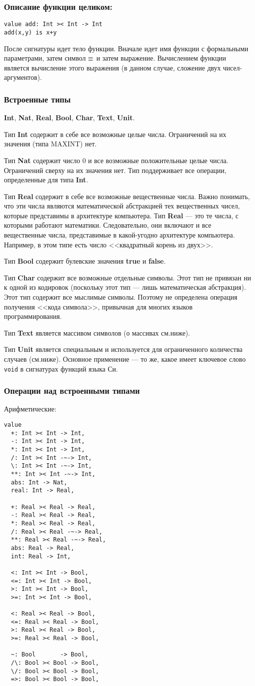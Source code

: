 \documentclass[14pt, twoside]{extreport}
\newcommand{\head}[1]{\vspace{1cm}\subsubsection*{#1}}
\begin{document}
\head{Описание функции целиком:}
\begin{lstlisting}
value add: Int >< Int -> Int
add(x,y) is x+y
\end{lstlisting}
После сигнатуры идет тело функции. Вначале идет имя функции с формальными параметрами, затем символ $\mathop{\equiv}$ и затем выражение. Вычислением функции является вычисление этого выражения (в данном случае, сложение двух чисел-аргументов).

\head{Встроенные типы}
\textbf{Int}, \textbf{Nat}, \textbf{Real}, \textbf{Bool}, \textbf{Char}, \textbf{Text}, \textbf{Unit}.

Тип \textbf{Int} содержит в себе все возможные целые числа. Ограничений на их значения (типа MAXINT) нет.

Тип \textbf{Nat} содержит число 0 и все возможные положительные целые числа. Ограничений сверху на их значения нет. Тип поддерживает все операции, определенные для типа \textbf{Int}.

Тип \textbf{Real} содержит в себе все возможные вещественные числа. Важно понимать, что эти числа являются математической абстракцией тех вещественных чисел, которые представимы в архитектуре компьютера. Тип \textbf{Real} --- это те числа, с которыми работают математики. Следовательно, они включают и все вещественные числа, представимые в какой-угодно архитектуре компьютера. Например, в этом типе есть число <<квадратный корень из двух>>.

Тип \textbf{Bool} содержит булевские значения \textbf{true} и \textbf{false}.

Тип \textbf{Char} содержит все возможные отдельные символы. Этот тип не привязан ни к одной из кодировок (поскольку этот тип --- лишь математическая абстракция). Этот тип содержит все мыслимые символы. Поэтому не определена операция получения <<кода символа>>, привычная для многих языков программирования.

Тип \textbf{Text} является массивом символов (о массивах см.ниже).

Тип \textbf{Unit} является специальным и используется для ограниченного количества случаев (см.ниже). Основное применение --- то же, какое имеет ключевое слово \texttt{void} в сигнатурах функций языка Си.

\head{Операции над встроенными типами}
Арифметические:
\begin{lstlisting}
value
  +: Int >< Int -> Int,
  -: Int >< Int -> Int,
  *: Int >< Int -> Int,
  /: Int >< Int -~-> Int,
  \: Int >< Int -~-> Int,
  **: Int >< Int -~-> Int,
  abs: Int -> Nat,
  real: Int -> Real,

  +: Real >< Real -> Real,
  -: Real >< Real -> Real,
  *: Real >< Real -> Real,
  /: Real >< Real -~-> Real,
  **: Real >< Real -~-> Real,
  abs: Real -> Real,
  int: Real -> Int,

  <: Int >< Int -> Bool,
  <=: Int >< Int -> Bool,
  >: Int >< Int -> Bool,
  >=: Int >< Int -> Bool,
  
  <: Real >< Real -> Bool,
  <=: Real >< Real -> Bool,
  >: Real >< Real -> Bool,
  >=: Real >< Real -> Bool,

  ~: Bool       -> Bool,
  /\: Bool >< Bool -> Bool,
  \/: Bool >< Bool -> Bool,
  =>: Bool >< Bool -> Bool,
\end{lstlisting}
\end{document}
